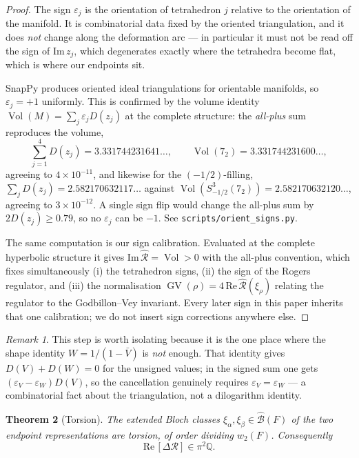 \documentclass[11pt]{article}
\newtheorem{theorem}{Theorem}
\theoremstyle{remark}
\newtheorem{remark}[theorem]{Remark}
\DeclareMathOperator{\GV}{GV}
\DeclareMathOperator{\Vol}{Vol}
\newcommand{\QQ}{\mathbb{Q}}
\begin{document}
\begin{proof}
The sign $\varepsilon_j$ is the orientation of tetrahedron $j$ relative to the
orientation of the manifold. It is combinatorial data fixed by the oriented
triangulation, and it does \emph{not} change along the deformation arc --- in
particular it must not be read off the sign of $\mathrm{Im}\,z_j$, which
degenerates exactly where the tetrahedra become flat, which is where our
endpoints sit.

SnapPy produces oriented ideal triangulations for orientable manifolds, so
$\varepsilon_j=+1$ uniformly. This is confirmed by the volume identity
$\Vol(M)=\sum_j\varepsilon_j D(z_j)$ at the complete structure: the
\emph{all-plus} sum reproduces the volume,
\[
\sum_{j=1}^{4}D(z_j)=3.331744231641\ldots,\qquad
\Vol(7_2)=3.331744231600\ldots,
\]
agreeing to $4\times10^{-11}$, and likewise for the $(-1/2)$-filling,
$\sum_j D(z_j)=2.582170632117\ldots$ against
$\Vol(S^3_{-1/2}(7_2))=2.582170632120\ldots$, agreeing to $3\times10^{-12}$. A
single sign flip would change the all-plus sum by $2D(z_j)\ge0.79$, so no
$\varepsilon_j$ can be $-1$. See \texttt{scripts/orient\_signs.py}.

The same computation is our sign calibration. Evaluated at the complete
hyperbolic structure it gives
$\mathrm{Im}\,\widehat{\mathcal R}=\Vol>0$ with the all-plus convention, which
fixes simultaneously (i) the tetrahedron signs, (ii) the sign of the Rogers
regulator, and (iii) the normalisation
$\GV(\rho)=4\,\mathrm{Re}\,\widehat{\mathcal R}(\xi_\rho)$ relating the regulator
to the Godbillon--Vey invariant. Every later sign in this paper inherits that one
calibration; we do not insert sign corrections anywhere else.
\end{proof}

\begin{remark}
This step is worth isolating because it is the one place where the shape identity
$W=1/(1-\bar V)$ is \emph{not} enough. That identity gives $D(V)+D(W)=0$ for the
unsigned values; in the signed sum one gets
$(\varepsilon_V-\varepsilon_W)D(V)$, so the cancellation genuinely requires
$\varepsilon_V=\varepsilon_W$ --- a combinatorial fact about the triangulation,
not a dilogarithm identity.
\end{remark}

\begin{theorem}[Torsion]\label{thm:torsion}
The extended Bloch classes $\xi_\alpha,\xi_\beta\in\widehat{\mathcal B}(F)$ of the
two endpoint representations are torsion, of order dividing $w_2(F)$.
Consequently
\[
\mathrm{Re}\,[\Delta\mathcal R]\in\pi^2\QQ .
\]
\end{theorem}
\end{document}
